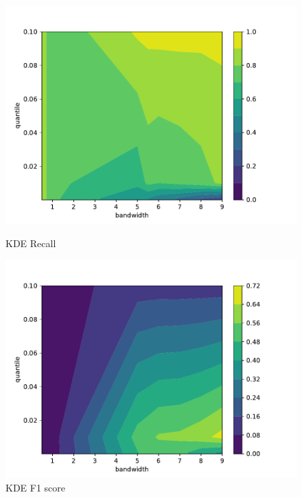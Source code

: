 \begin{figure}[p]
    \begin{minipage}[t]{0.5\textwidth}
        \vspace{0pt}
        \includegraphics[width=\textwidth]{images/kde-recall.pdf}
        \caption{KDE Recall}
    \end{minipage}
    \hfill
    \begin{minipage}[t]{0.5\textwidth}
        \vspace{0pt}
        \includegraphics[width=\textwidth]{images/kde-f1.pdf}
        \caption{KDE F1 score}
    \end{minipage}
\end{figure}

\noindent

